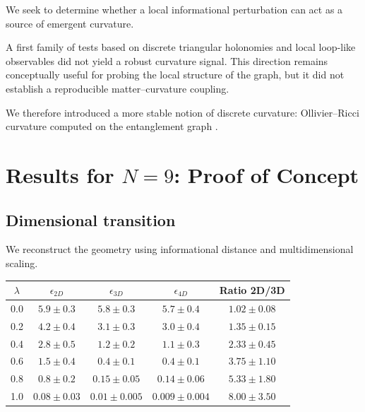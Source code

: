 \documentclass[11pt]{article}
\begin{document}
We seek to determine whether a local informational perturbation can act as a source of emergent curvature.

A first family of tests based on discrete triangular holonomies and local loop-like observables did not yield a robust curvature signal. This direction remains conceptually useful for probing the local structure of the graph, but it did not establish a reproducible matter--curvature coupling.

We therefore introduced a more stable notion of discrete curvature: Ollivier--Ricci curvature computed on the entanglement graph \cite{ollivier}.


\section{Results for $N=9$: Proof of Concept}

\subsection{Dimensional transition}

We reconstruct the geometry using informational distance and multidimensional scaling.

\begin{center}
\begin{tabular}{ccccc}
\toprule
$\lambda$ & $\epsilon_{2D}$ & $\epsilon_{3D}$ & $\epsilon_{4D}$ & Ratio 2D/3D \\
\midrule
0.0 & $5.9 \pm 0.3$ & $5.8 \pm 0.3$ & $5.7 \pm 0.4$ & $1.02 \pm 0.08$ \\
0.2 & $4.2 \pm 0.4$ & $3.1 \pm 0.3$ & $3.0 \pm 0.4$ & $1.35 \pm 0.15$ \\
0.4 & $2.8 \pm 0.5$ & $1.2 \pm 0.2$ & $1.1 \pm 0.3$ & $2.33 \pm 0.45$ \\
0.6 & $1.5 \pm 0.4$ & $0.4 \pm 0.1$ & $0.4 \pm 0.1$ & $3.75 \pm 1.10$ \\
0.8 & $0.8 \pm 0.2$ & $0.15 \pm 0.05$ & $0.14 \pm 0.06$ & $5.33 \pm 1.80$ \\
1.0 & $0.08 \pm 0.03$ & $0.01 \pm 0.005$ & $0.009 \pm 0.004$ & $8.00 \pm 3.50$ \\
\bottomrule
\end{tabular}
\end{center}
\end{document}
